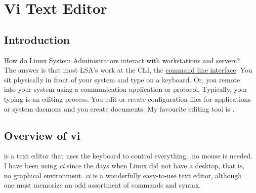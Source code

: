 \chapter{Vi Text Editor}
\pagestyle{fancy}

\fancyhf{} %
\fancyhead[OC]{\leftmark} %
\setlength{\headheight}{13.6pt} 
\cfoot{\thepage} %

\section{Introduction}
How do Linux System Administrators interact with workstations and servers? The answer is that most LSA's work at the CLI, the \href{https://en.wikipedia.org/wiki/Command-line\_interface}{command line interface}. You sit physically in front of your system and type on a keyboard. Or, you remote into your system using a communication application or protocol. Typically, your typing is an editing process. You edit or create configuration files for applications or system daemons and you create documents. My favourite editing tool is .

\section{Overview of vi}
 is a text editor that uses the keyboard to control everything...no mouse is needed. I have been using \emph{vi} since the days when Linux did not have a desktop, that is, no graphical environment. \emph{vi} is a wonderfully easy-to-use text editor, although one must memorize an odd assortment of commands and syntax.


